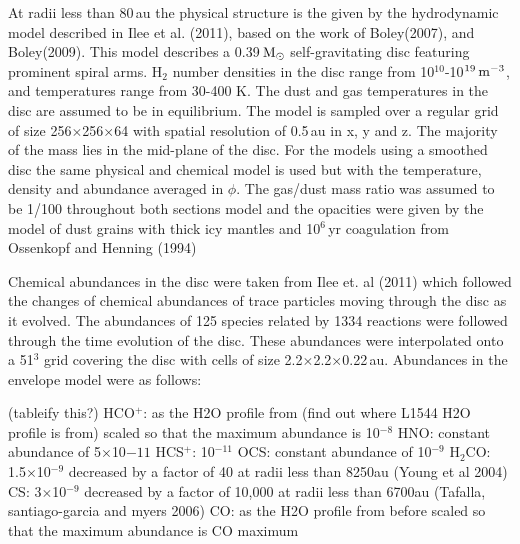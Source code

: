 \documentclass[useAMS,usenatbib]{mn2e}
\begin{document}
At radii less than 80$\,$au the physical structure is the given by the hydrodynamic model described in Ilee et al. (2011), based on the work of Boley(2007), and Boley(2009). This model describes a 0.39$\,\rm{M}_\odot$ self-gravitating disc featuring prominent spiral arms. H$_2$ number densities in the disc range from 10$^{10}$-10$^{19}\,\rm{m}^{-3}$, and temperatures range from 30-400 K. The dust and gas temperatures in the disc are assumed to be in equilibrium. The model is sampled over a regular grid of size 256$\times$256$\times$64 with spatial resolution of 0.5$\,$au in x, y and z. The majority of the mass lies in the mid-plane of the disc. For the models using a smoothed disc the same physical and chemical model is used but with the temperature, density and abundance averaged in $\phi$. The gas/dust mass ratio was assumed to be 1/100 throughout both sections model and the opacities were given by the model of dust grains with thick icy mantles and 10$^6\,$yr coagulation from Ossenkopf and Henning (1994)\newline

Chemical abundances in the disc were taken from Ilee et. al (2011) which followed the changes of chemical abundances of trace particles moving through the disc as it evolved. The abundances of 125 species related by 1334 reactions were followed through the time evolution of the disc. These abundances were interpolated onto a 51$^3$ grid covering the disc with cells of size 2.2$\times$2.2$\times$0.22$\,$au. Abundances in the envelope model were as follows:\newline

(tableify this?)\newline
HCO$^+$: as the H2O profile from (find out where L1544 H2O profile is from) scaled so that the maximum abundance is 10$^{-8}$\newline
HNO: constant abundance of 5$\times$10${-11}$\newline
HCS$^+$: 10$^{-11}$\newline
OCS: constant abundance of 10$^{-9}$\newline
H$_2$CO: 1.5$\times$10$^{-9}$ decreased by a factor of 40 at radii less than 8250au (Young et al 2004)\newline
CS:  3$\times$10$^{-9}$ decreased by a factor of 10,000 at radii less than 6700au (Tafalla, santiago-garcia and myers 2006)\newline
CO: as the H2O profile from before scaled so that the maximum abundance is CO maximum\newline
\end{document}
